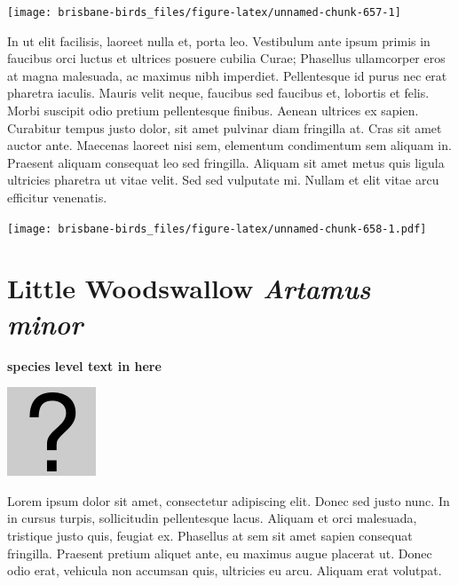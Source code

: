\documentclass[]{book}
\let\origfigure\figure
\let\endorigfigure\endfigure
\renewenvironment{figure}[1][2] {
  \expandafter\origfigure\expandafter[H]
} {
  \endorigfigure
}
\begin{document}
\begin{figure}
\texttt{[image: brisbane-birds\_files/figure-latex/unnamed-chunk-657-1]} \caption{insert figure caption}\label{fig:unnamed-chunk-657}
\end{figure}

In ut elit facilisis, laoreet nulla et, porta leo. Vestibulum ante ipsum
primis in faucibus orci luctus et ultrices posuere cubilia Curae;
Phasellus ullamcorper eros at magna malesuada, ac maximus nibh
imperdiet. Pellentesque id purus nec erat pharetra iaculis. Mauris velit
neque, faucibus sed faucibus et, lobortis et felis. Morbi suscipit odio
pretium pellentesque finibus. Aenean ultrices ex sapien. Curabitur
tempus justo dolor, sit amet pulvinar diam fringilla at. Cras sit amet
auctor ante. Maecenas laoreet nisi sem, elementum condimentum sem
aliquam in. Praesent aliquam consequat leo sed fringilla. Aliquam sit
amet metus quis ligula ultricies pharetra ut vitae velit. Sed sed
vulputate mi. Nullam et elit vitae arcu efficitur venenatis.

\begin{figure}
\centering
\texttt{[image: brisbane-birds\_files/figure-latex/unnamed-chunk-658-1.pdf]}
\caption{\label{fig:unnamed-chunk-658}insert figure caption}
\end{figure}

\section{\texorpdfstring{Little Woodswallow \emph{Artamus
minor}}{Little Woodswallow Artamus minor}}\label{little-woodswallow-artamus-minor}

\textbf{species level text in here}

\begin{figure}
\centering
\includegraphics{assets/missing.png}
\caption{No image for species}
\end{figure}

Lorem ipsum dolor sit amet, consectetur adipiscing elit. Donec sed justo
nunc. In in cursus turpis, sollicitudin pellentesque lacus. Aliquam et
orci malesuada, tristique justo quis, feugiat ex. Phasellus at sem sit
amet sapien consequat fringilla. Praesent pretium aliquet ante, eu
maximus augue placerat ut. Donec odio erat, vehicula non accumsan quis,
ultricies eu arcu. Aliquam erat volutpat.
\end{document}
